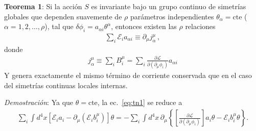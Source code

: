 \begin{frame}
\textbf{Teorema 1}: Si la acción $S$ es invariante bajo un grupo continuo de simetrías globales que dependen suavemente de $\rho$ parámetros independientes $\theta_{\alpha}=\text{cte}$ ($\alpha=1,2,\ldots, \rho$), tal que $\delta\phi_i=a_{\alpha i}\theta^{\alpha}$, entonces existen las $\rho$ relaciones
\begin{align}
\sum_{i}\mathcal{E}_i a_{\alpha i}\equiv \partial_{\mu} j^{\mu}_{\alpha}\,,  
\end{align}
donde
\begin{align}
  \label{eq:thn1}
j^{\mu}_{\alpha}\equiv \sum_{i}B^{\mu}_i=\sum_{i}  \frac{\partial\mathcal{L}}{\partial(\partial_{\mu}\phi_i)}a_{\alpha i}
\end{align}
Y genera exactamente el mismo término de corriente conservada que en el caso del simetrías continuas locales internas.
\end{frame}

\emph{Demostración}:  Ya que $\theta=\text{cte}$, la ec.~\eqref{eq:tn1} se reduce a
\begin{align*}
  \sum_i\int {d^4}x \left[ \mathcal{E}_ia_i -  \partial_{\mu}   \left(  \mathcal{E}_i b^{\mu}_i  \right) \right]  \theta    =-  \sum_i \int {d^4}x\, \partial_{\mu} \left\{ \left[ \frac{\partial\mathcal{L}}{\partial(\partial_{\mu}\phi_i)}\right] a_i \theta  -\mathcal{E}_i b^{\mu}_i \theta  \right\}.
\end{align*}

